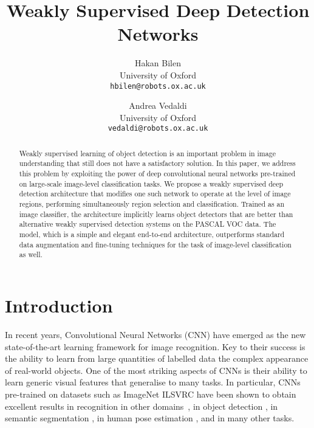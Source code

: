 \documentclass[10pt,twocolumn,letterpaper]{article}
\begin{document}


\title{Weakly Supervised Deep Detection Networks}
\author{Hakan Bilen\\
University of Oxford\\
{\tt\small hbilen@robots.ox.ac.uk}
\and
Andrea Vedaldi\\
University of Oxford\\
{\tt\small vedaldi@robots.ox.ac.uk}
}



\maketitle
\begin{abstract}
Weakly supervised learning of object detection is an important problem in image understanding that still does not have a satisfactory solution.  In this paper, we address this problem by exploiting the power of deep convolutional neural networks pre-trained on large-scale image-level classification tasks. We propose a weakly supervised deep detection architecture that modifies one such network to operate at the level of image regions, performing simultaneously region selection and classification. Trained as an image classifier, the architecture implicitly learns object detectors that are better than alternative weakly supervised detection systems on the PASCAL VOC data. The model, which is a simple and elegant end-to-end architecture, outperforms standard data augmentation and fine-tuning techniques for the task of image-level classification as well.

\end{abstract}

\section{Introduction}\label{s:intro}
In recent years, Convolutional Neural Networks (CNN) \cite{Lecun89} have emerged as the new state-of-the-art learning framework for image recognition. Key to their success is the ability to learn from large quantities of labelled data the complex appearance of real-world objects. One of the most striking aspects of CNNs is their ability to learn generic visual features that generalise to many tasks. In particular, CNNs pre-trained on datasets such as ImageNet ILSVRC have been shown to obtain excellent results in recognition in other domains~\cite{Donahue13}, in object detection \cite{Girshick14}, in semantic segmentation \cite{Hariharan14}, in human pose estimation \cite{Toshev13}, and in many other tasks.
\end{document}
